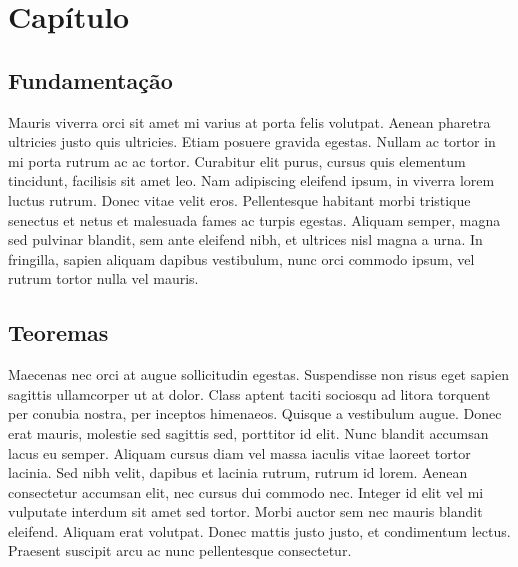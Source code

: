 
\chapter{Capítulo}


\section{Fundamentação }

Mauris viverra orci sit amet \citeauthor{article:dummy} mi varius at porta
felis volutpat. Aenean pharetra ultricies justo quis ultricies. Etiam
posuere gravida egestas. Nullam ac tortor in mi porta rutrum ac ac
tortor. Curabitur elit purus, cursus quis elementum tincidunt, facilisis
sit amet leo. Nam adipiscing eleifend ipsum, in viverra lorem luctus
rutrum. Donec vitae velit eros. Pellentesque habitant morbi tristique
senectus et netus et malesuada fames ac turpis egestas. Aliquam semper,
magna sed pulvinar blandit, sem ante eleifend nibh, et ultrices nisl
magna a urna. In fringilla, sapien aliquam dapibus vestibulum, nunc
orci commodo ipsum, vel rutrum tortor nulla vel mauris.

\section{Teoremas}

Maecenas nec orci at augue sollicitudin egestas. Suspendisse non risus
eget sapien sagittis ullamcorper ut at dolor. Class aptent taciti
sociosqu ad litora torquent per conubia nostra, per inceptos himenaeos.
Quisque a vestibulum augue. Donec erat mauris, molestie sed sagittis
sed, porttitor id elit. Nunc blandit accumsan lacus eu semper. Aliquam
cursus diam vel massa iaculis vitae laoreet tortor lacinia. Sed nibh
velit, dapibus et lacinia rutrum, rutrum id lorem. Aenean consectetur
accumsan elit, nec cursus dui commodo nec. Integer id elit vel mi
vulputate interdum sit amet sed tortor. Morbi auctor sem nec mauris
blandit eleifend. Aliquam erat volutpat. Donec mattis justo justo,
et condimentum lectus. Praesent suscipit arcu ac nunc pellentesque
consectetur.

